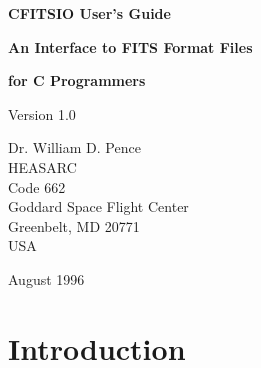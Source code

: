%
\oddsidemargin=0.25in
\evensidemargin=0.00in
\textwidth=6.0in
\topmargin=0.0in
\textheight=8.75in
\parindent=0cm
\parskip=0.2cm


\begin{titlepage}
\normalsize
\vspace*{4.0cm}
\begin{center}
{\Huge \bf CFITSIO User's Guide}\\
\end{center}
\medskip 
\medskip 
\begin{center}
{\LARGE \bf An Interface to FITS Format Files}\\
\end{center}
\begin{center}
{\LARGE \bf for C Programmers}\\
\end{center}
\medskip
\medskip
\begin{center}
{\Large Version 1.0\\}
\end{center}
\bigskip
\vskip 3.0cm
\begin{center}
{Dr. William D. Pence\\
HEASARC\\
Code 662\\
Goddard Space Flight Center\\
Greenbelt, MD 20771\\
USA}
\end{center}

\vfill
\bigskip
\begin{center}
{\Large August 1996\\}
\end{center}
\vfill
\end{titlepage}

\begin{titlepage}
\vspace*{7.6cm}
\vfill
\end{titlepage}


\tableofcontents

\chapter{Introduction }

